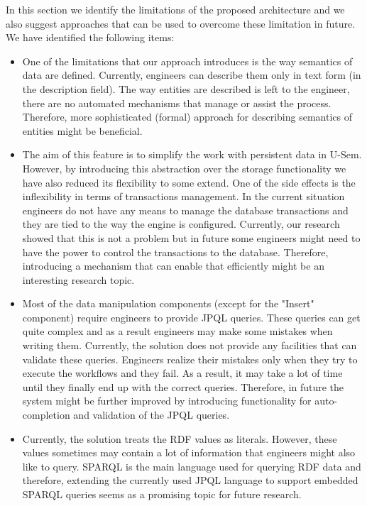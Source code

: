 In this section we identify the limitations of the proposed architecture and we also suggest approaches that can be used to overcome these limitation in future. We have identified the following items:

\begin{itemize}
\item One of the limitations that our approach introduces is the way semantics of data are defined. Currently, engineers can describe them only in text form (in the description field). The way entities are described is left to the engineer, there are no automated mechanisms that manage or assist the process. Therefore, more sophisticated (formal) approach for describing semantics of entities might be beneficial.

\item The aim of this feature is to simplify the work with persistent data in U-Sem. However, by introducing this abstraction over the storage functionality we have also reduced its flexibility to some extend. One of the side effects is the inflexibility in terms of transactions management. In the current situation engineers do not have any means to manage the database transactions and they are tied to the way the engine is configured. Currently, our research showed that this is not a problem but in future some engineers might need to have the power to control the transactions to the database. Therefore, introducing a mechanism that can enable that efficiently might be an interesting research topic.

\item Most of the data manipulation components (except for the "Insert" component) require engineers to provide JPQL queries. These queries can get quite complex and as a result engineers may make some mistakes when writing them. Currently, the solution does not provide any facilities that can validate these queries. Engineers realize their mistakes only when they try to execute the workflows and they fail. As a result, it may take a lot of time until they finally end up with the correct queries. Therefore, in future the system might be further improved by introducing functionality for auto-completion and validation of the JPQL queries.

\item Currently, the solution treats the RDF values as literals. However, these values sometimes may contain a lot of information that engineers might also like to query. SPARQL is the main language used for querying RDF data \cite{perez2006semantics} and therefore, extending the currently used JPQL language to support embedded SPARQL queries seems as a promising topic for future research.


\end{itemize}
